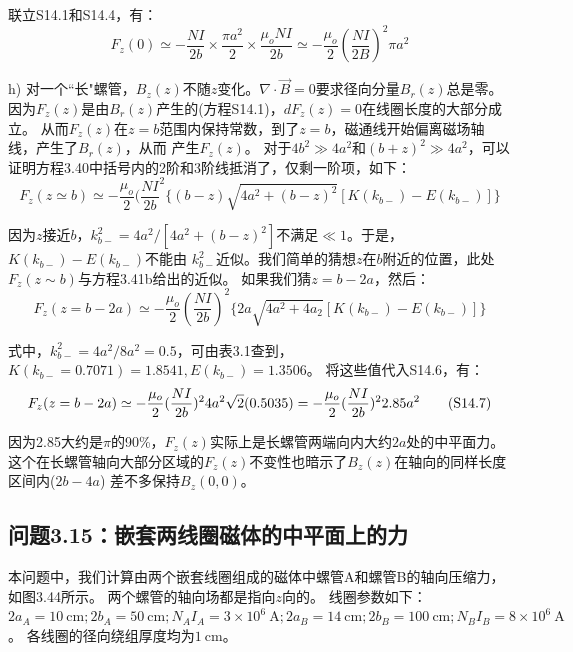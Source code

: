 联立S14.1和S14.4，有：
\begin{equation*}
F_{z}(0)\simeq-\frac{NI}{2b}\times\frac{\pi a^{2}}{2}\times\frac{\mu_{o}NI}{2b}\simeq-\frac{\mu_{o}}{2}(\frac{NI}{2B})^{2}\pi a^{2}\tag{3.41b}%
\end{equation*}

h) 对一个``长"螺管，$B_z(z)$不随$z$变化。$\nabla\cdot \vec{B}=0$要求径向分量$B_r(z)$总是零。
因为$F_z(z)$是由$B_r(z)$产生的(方程S14.1)，$dF_z(z)=0$在线圈长度的大部分成立。
从而$F_z(z)$在$z=b$范围内保持常数，到了$z =b$，磁通线开始偏离磁场轴线，产生了$B_r(z)$，从而
产生$F_z(z)$。
对于$4b^2\gg 4a^2$和$(b+z)^2\gg 4a^2$，可以证明方程3.40中括号内的2阶和3阶线抵消了，仅剩一阶项，如下：
\begin{equation*}
F_{z}(z\simeq b)\simeq-\frac{\mu_{o}}{2}(\frac{NI}{2b}^{2}\{(b-z)\sqrt{4a^{2}+(b-z)^{2}}[K(k_{b-})-E(k_{b-})]\}\tag{S14.5}%
\end{equation*}

因为$z$接近$b$，$k_{b−}^2 = 4a^2/[4a^2+(b−z)^2]$不满足$\ll 1$。于是，$K(k_{b−})−E(k_{b−})$不能由
$k_{b-}^2$近似。我们简单的猜想$z$在$b$附近的位置，此处$F_z(z\sim b)$与方程3.41b给出的近似。
如果我们猜$z=b-2a$，然后：
\begin{equation*}
F_{z}(z=b-2a)\simeq-\frac{\mu_{o}}{2}(\frac{NI}{2b})^{2}\{2a\sqrt{4a^{2}+4a_{2}}[K(k_{b-})-E(k_{b-})]\}\tag{S14.6}%
\end{equation*}

式中，$k^2_{b-}=4a^2/8a^2 =0.5$，可由表3.1查到，$K(k_{b−} =0.7071)=1.8541,E(k_{b−})=1.3506$。
将这些值代入S14.6，有：
\begin{equation*}
F_{z}(z=b-2a)\simeq-\frac{\mu_{o}}{2}(\frac{NI}{2b})^{2}4a^{2}\sqrt{2}(0.5035)\\
=-\frac{\mu_{o}}{2}(\frac{NI}{2b})^{2}2.85a^{2}\tag{S14.7}%
\end{equation*}

因为2.85大约是$\pi$的90\%，$F_z(z)$实际上是长螺管两端向内大约$2a$处的中平面力。
这个在长螺管轴向大部分区域的$F_z(z)$不变性也暗示了$B_z(z)$在轴向的同样长度区间内($2b-4a$)
差不多保持$B_z(0,0)$。



\subsection{问题3.15：嵌套两线圈磁体的中平面上的力}
本问题中，我们计算由两个嵌套线圈组成的磁体中螺管A和螺管B的轴向压缩力，如图3.44所示。
两个螺管的轴向场都是指向$z$向的。
线圈参数如下：$2a_A=10\ \mathrm{cm};2b_A = 50\ \mathrm{cm}; N_A I_A = 3\times 10^6\ \mathrm{A};
2a_B = 14\ \mathrm{cm}; 2b_B = 100\ \mathrm{cm}; N_B I_B = 8\times10^6\ \mathrm{A}$。
各线圈的径向绕组厚度均为$1\ \mathrm{cm}$。

